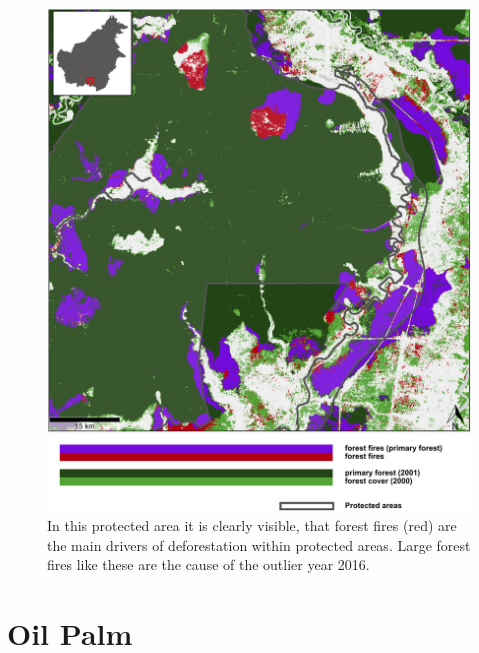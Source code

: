 \documentclass[
  letterpaper,
  DIV=11,
  numbers=noendperiod]{scrreprt}
\begin{document}
\begin{figure}

{\centering \includegraphics[width=1\textwidth,height=\textheight]{text/../code/results/maps/deforestation_protected_areas_forest_fires.png}

}

\caption{\label{fig-mapforestfires}In this protected area it is clearly
visible, that forest fires (red) are the main drivers of deforestation
within protected areas. Large forest fires like these are the cause of
the outlier year 2016.}

\end{figure}

\hypertarget{oil-palm}{%
\section{Oil Palm}\label{oil-palm}}
\end{document}
